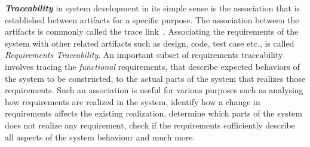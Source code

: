 \emph{\textbf{Traceability}} in system development in its simple sense is the association that is established between artifacts for a specific purpose. The association between the artifacts is commonly called the trace link~\cite{gotel2012traceability}. Associating the requirements of the system with other related artifacts such as design, code, test case etc., is called \emph{Requirements Traceability}. An important subset of requirements traceability involves tracing the {\em functional} requirements, that describe expected behaviors of the system to be constructed, to the actual parts of the system that realizes those requirements. Such an association is useful for various purposes such as analysing how requirements are realized in the system, identify how a change in requirements affects the existing realization, determine which parts of the system does not realize any requirement, check if the requirements sufficiently describe all aspects of the system behaviour and much more.

